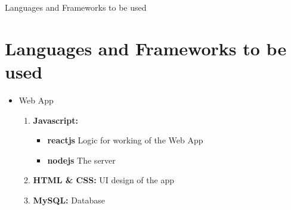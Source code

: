 \documentclass{beamer}
\begin{document}
\begin{frame}{Languages and Frameworks to be used}
    \section{Languages and Frameworks to be used}

    \begin{itemize}
        \item Web App
              \begin{enumerate}
                  \item \textbf{Javascript:}
                        \begin{itemize}
                            \item \textbf{reactjs} Logic for working of the Web App
                            \item \textbf{nodejs} The server
                        \end{itemize}
                  \item \textbf{HTML \& CSS:} UI design of the app
                  \item \textbf{MySQL:} Database
              \end{enumerate}
    \end{itemize}
\end{frame}
\end{document}
